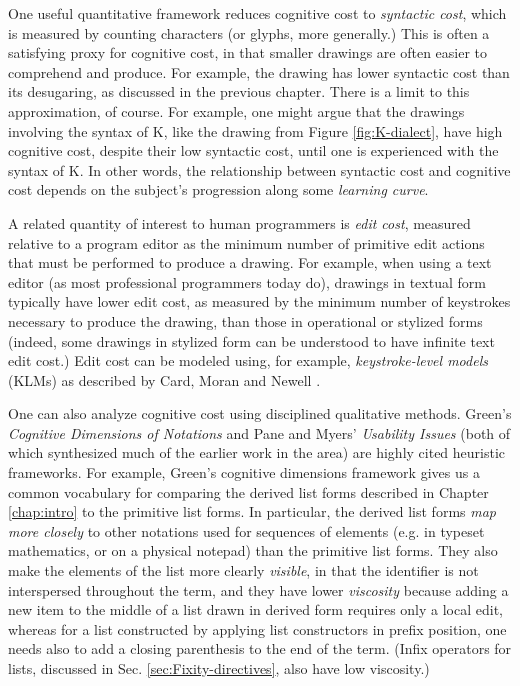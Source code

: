 One useful quantitative framework reduces cognitive cost to \emph{syntactic cost}, which is measured by counting characters (or glyphs, more generally.) This is often a satisfying proxy for cognitive cost, in that smaller drawings are often easier to comprehend and produce. For example, the drawing \li{[x, y, z]} has lower syntactic cost than its desugaring, as discussed in the previous chapter. There is a limit to this approximation, of course. For example, one might argue that the drawings involving the syntax of K, like the drawing from Figure \ref{fig:K-dialect}, have high cognitive cost, despite their low syntactic cost, until one is experienced with the syntax of K. In other words, the relationship between syntactic cost and cognitive cost depends on the subject's progression along some \emph{learning curve}.

A related quantity of interest to human programmers is \emph{edit cost}, measured relative to a program editor as the minimum number of primitive edit actions that must be performed to produce a drawing. For example, when using a text editor (as most professional programmers today do), drawings in textual form typically have lower edit cost, as measured by the minimum number of keystrokes necessary to produce the drawing, than those in operational or stylized forms (indeed, some drawings in stylized form can be understood to have infinite text edit cost.) Edit cost can be modeled using, for example, \emph{keystroke-level models} (KLMs) as described by Card, Moran and Newell \cite{journals/cacm/CardMN80}.%

One can also analyze cognitive cost using disciplined qualitative methods. Green's \emph{Cognitive Dimensions of Notations} \cite{Green89,green1996usability} and Pane and Myers' \emph{Usability Issues} \cite{pane1996usability} (both of which synthesized much of the earlier work in the area) are highly cited heuristic frameworks. For example, Green's cognitive dimensions framework gives us a common vocabulary for  comparing the derived list forms described in Chapter \ref{chap:intro} to the primitive list forms. In particular, the derived list forms \emph{map more closely} to other notations used for sequences of elements (e.g. in typeset mathematics, or on a physical notepad) than the primitive list forms. They also make the elements of the list more clearly \emph{visible}, in that the identifier  is not interspersed throughout the term, and they have lower \emph{viscosity} because adding a new item to the middle of a list drawn in derived form requires only a local edit, whereas for a list constructed by applying list constructors in prefix position, one needs also to add a closing parenthesis to the end of the term. (Infix operators for lists, discussed in Sec. \ref{sec:Fixity-directives}, also have low viscosity.)

